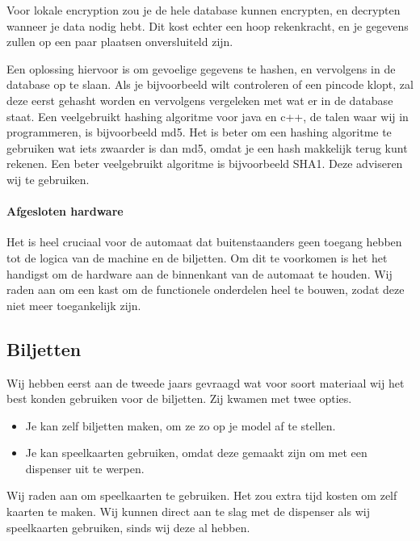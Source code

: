 \documentclass{article}
\begin{document}
Voor lokale encryption zou je de hele database kunnen encrypten, en decrypten wanneer je data nodig hebt.
Dit kost echter een hoop rekenkracht, en je gegevens zullen op een paar plaatsen onversluiteld zijn.

Een oplossing hiervoor is om gevoelige gegevens te hashen, en vervolgens in de database op te slaan.
Als je bijvoorbeeld wilt controleren of een pincode klopt, zal deze eerst gehasht worden en vervolgens vergeleken met wat er in de database staat.
Een veelgebruikt hashing algoritme voor java en c++, de talen waar wij in programmeren, is bijvoorbeeld md5.
Het is beter om een hashing algoritme te gebruiken wat iets zwaarder is dan md5, omdat je een hash makkelijk terug kunt rekenen.
Een beter veelgebruikt algoritme is bijvoorbeeld SHA1.
Deze adviseren wij te gebruiken.

\hfill

\centerline{  }

\paragraph{Afgesloten hardware}

Het is heel cruciaal voor de automaat dat buitenstaanders geen toegang hebben tot de logica van de machine en de biljetten.
Om dit te voorkomen is het het handigst om de hardware aan de binnenkant van de automaat te houden.
Wij raden aan om een kast om de functionele onderdelen heel te bouwen, zodat deze niet meer toegankelijk zijn.

\subsection{Biljetten}

Wij hebben eerst aan de tweede jaars gevraagd wat voor soort materiaal wij het best konden gebruiken voor de biljetten.
Zij kwamen met twee opties.
\begin{itemize}
\item Je kan zelf biljetten maken, om ze zo op je model af te stellen.
\item Je kan speelkaarten gebruiken, omdat deze gemaakt zijn om met een dispenser uit te werpen.
\end{itemize}

Wij raden aan om speelkaarten te gebruiken.
Het zou extra tijd kosten om zelf kaarten te maken.
Wij kunnen direct aan te slag met de dispenser als wij speelkaarten gebruiken, sinds wij deze al hebben.
\end{document}
